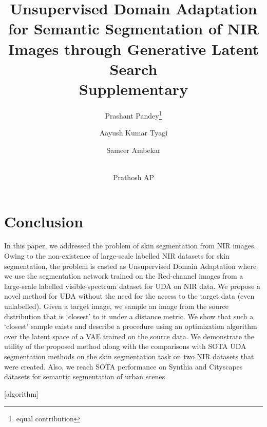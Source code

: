 \documentclass[runningheads]{llncs}
\makeatletter
\newcommand{\printfnsymbol}[1]{\textsuperscript{\@fnsymbol{#1}}}
\makeatother
\begin{document}
\section{Conclusion}
 In this paper, we addressed the problem of skin segmentation from NIR images. Owing to the non-existence of large-scale labelled NIR datasets for skin segmentation, the problem is casted as Unsupervised Domain Adaptation where we use the segmentation network trained on the Red-channel images from a large-scale labelled visible-spectrum dataset for UDA on NIR data. We propose a novel method for UDA without the need for the access to the target data (even unlabelled). Given a target image, we sample an image from the source distribution that is `closest' to  it under a distance metric. We show that such a `closest' sample exists and describe a procedure using an optimization algorithm over the latent space of a VAE trained on the source data. We demonstrate the utility of the proposed method along with the comparisons with SOTA UDA segmentation methods on the skin segmentation task on two NIR datasets that were created. Also, we reach SOTA performance on Synthia and Cityscapes datasets for semantic segmentation of urban scenes.
 \clearpage



\makeatletter
{}[algorithm]
\newlength{\phaserulewidth}
\newcommand{\setphaserulewidth}{\setlength{\phaserulewidth}}
\newcommand{\phase}[1]{\vspace{-2.2ex}
\Statex\leavevmode\llap{\rule{\dimexpr\labelwidth+\labelsep}{\phaserulewidth}}\rule{\linewidth}{\phaserulewidth}
  \Statex\strut\refstepcounter{phase}\textbf{#1}\vspace{-2.2ex}\Statex\leavevmode\llap{\rule{\dimexpr\labelwidth+\labelsep}{\phaserulewidth}}\rule{\linewidth}{\phaserulewidth}}
\makeatother
\setphaserulewidth{.35pt}

\title{Unsupervised Domain Adaptation for Semantic Segmentation of NIR Images through Generative Latent Search
\\
Supplementary} 



\author{Prashant Pandey\thanks{equal contribution} \and
Aayush Kumar Tyagi\printfnsymbol{1} \and
Sameer Ambekar \and \\ Prathosh AP}
\end{document}
